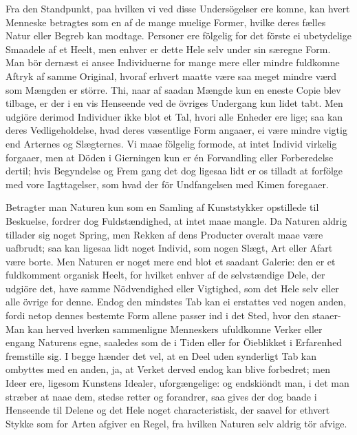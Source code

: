 \documentclass[12pt,a4paper]{article}
\newcommand{\opage}[1]{\marginnote{\footnotesize\textit{[#1]}}}
\begin{document}
Fra den Standpunkt, paa hvilken vi ved disse Undersögelser ere komne, kan
hvert Menneske betragtes som en af de mange muelige Former, hvilke deres
fælles Natur eller Begreb kan modtage. Personer ere fölgelig for det förste
ei ubetydelige Smaadele af et Heelt, men enhver er dette Hele selv under sin
særegne Form. Man bör dernæst ei ansee Individuerne for mange mere eller
mindre fuldkomne Aftryk af samme Original, hvoraf erhvert maatte være saa
meget mindre værd som Mængden er större. Thi, naar af saadan Mængde kun en
eneste Copie blev tilbage, er der i en vis Henseende ved de övriges
Undergang kun lidet tabt. Men udgiöre derimod Individuer ikke blot et Tal,
hvori alle Enheder ere lige; saa kan deres Vedligeholdelse, hvad deres
væsentlige Form angaaer, ei være mindre vigtig end Arternes og Slægternes.
Vi maae fölgelig formode, at intet Individ virkelig forgaaer, men at Döden i
Gierningen kun er én Forvandling eller Forberedelse dertil; hvis Begyndelse
og Frem%
\opage{252}gang det dog ligesaa lidt er os tilladt at forfölge med vore Iagttagelser,
som hvad der för Undfangelsen med Kimen foregaaer.

Betragter man Naturen kun som en Samling af Kunststykker opstillede til
Beskuelse, fordrer dog Fuldstændighed, at intet maae mangle. Da Naturen
aldrig tillader sig noget Spring, men Rekken af dens Producter overalt maae
være uafbrudt; saa kan ligesaa lidt noget Individ, som nogen Slægt, Art
eller Afart være borte. Men Naturen er noget mere end blot et saadant
Galerie: den er et fuldkomment organisk Heelt, for hvilket enhver af de
selvstændige Dele, der udgiöre det, have samme Nödvendighed eller Vigtighed,
som det Hele selv eller alle övrige for denne. Endog den mindstes Tab kan ei
erstattes ved nogen anden, fordi netop dennes bestemte Form allene passer
ind i det Sted, hvor den staaer- Man kan herved hverken sammenligne
Menneskers ufuldkomne Verker eller engang Naturens egne, saaledes som de i
Tiden eller for Öieblikket i Erfarenhed fremstille sig. I begge hænder det
vel, at en Deel uden synderligt Tab kan ombyttes med en anden, ja, at Verket
derved endog kan blive forbedret; men Ideer ere, ligesom Kunstens Idealer,
uforgængelige: og endskiöndt man, i det man stræber at naae dem, stedse
retter og forandrer, saa gives der dog baade i Henseende til Delene og det
Hele noget characteristisk, der saavel for ethvert Stykke som for Arten
afgiver en Regel, fra hvilken Naturen selv aldrig tör afvige.
\end{document}
